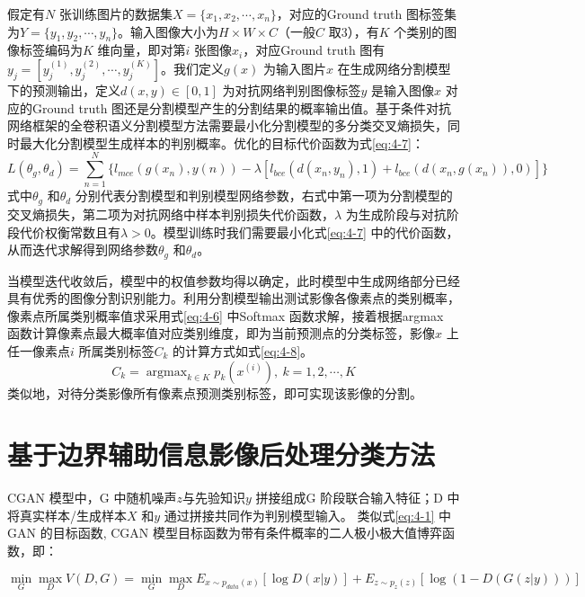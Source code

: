 假定有$N$ 张训练图片的数据集$X = \{x_1,x_2,\cdots, x_n \}$，对应的Ground truth 图标签集为$Y = \{y_1,y_2,\cdots, y_n \}$。输入图像大小为$H\times W\times C$（一般$C$ 取$3$），有$K$ 个类别的图像标签编码为$K$  维向量，即对第$i$ 张图像$x_i$，对应Ground truth 图有$y_j = [y_j^{(1)},y_j^{(2)}, \cdots, y_j^{(K)}]$。我们定义$g(x)$ 为输入图片$x$ 在生成网络分割模型下的预测输出，定义$d(x,y)\in [0,1]$ 为对抗网络判别图像标签$y$ 是输入图像$x$ 对应的Ground truth 图还是分割模型产生的分割结果的概率输出值。基于条件对抗网络框架的全卷积语义分割模型方法需要最小化分割模型的多分类交叉熵损失，同时最大化分割模型生成样本的判别概率。优化的目标代价函数为式\ref{eq:4-7}：
\begin{equation}
  \label{eq:4-7}
  L(\theta_g,\theta_d) = \sum_{n=1}^N \lbrace l_{mce} (g(x_n),y(n)) - \lambda [l_{bce} (d(x_n,y_n),1) + l_{bce}(d(x_n,g(x_n)),0)] \rbrace
\end{equation}
式中$\theta_g$ 和$\theta_d$ 分别代表分割模型和判别模型网络参数，右式中第一项为分割模型的交叉熵损失，第二项为对抗网络中样本判别损失代价函数，$\lambda$ 为生成阶段与对抗阶段代价权衡常数且有$\lambda > 0$。模型训练时我们需要最小化式\ref{eq:4-7} 中的代价函数，从而迭代求解得到网络参数$\theta_g$ 和$\theta_d$。

当模型迭代收敛后，模型中的权值参数均得以确定，此时模型中生成网络部分已经具有优秀的图像分割识别能力。利用分割模型输出测试影像各像素点的类别概率，像素点所属类别概率值求采用式\ref{eq:4-6} 中Softmax 函数求解，接着根据argmax 函数计算像素点最大概率值对应类别维度，即为当前预测点的分类标签，影像$x$ 上任一像素点$i$ 所属类别标签$C_k$ 的计算方式如式\ref{eq:4-8}。
\begin{equation}
  \label{eq:4-8}
  C_k = \mathop{\arg\max}_{k \in K} p_k(x^{(i)}), \ k=1,2,\cdots,K
\end{equation}
类似地，对待分类影像所有像素点预测类别标签，即可实现该影像的分割。


\section{基于边界辅助信息影像后处理分类方法}
\label{sec::chap04-4}
CGAN 模型中，G 中随机噪声$z$与先验知识$y$ 拼接组成G 阶段联合输入特征；D 中将真实样本/生成样本$X$ 和$y$ 通过拼接共同作为判别模型输入。 类似式\ref{eq:4-1} 中GAN 的目标函数, CGAN 模型目标函数为带有条件概率的二人极小极大值博弈函数，即：

\begin{equation}
  \label{eq:4-3}
  \mathop{\min}_{G} \mathop{\max}_{D} V(D,G) = \mathop{\min}_{G} \mathop{\max}_{D} E_{x \sim p_{data}(x)} [\log D(x|y)] + E_{z \sim p_{z}(z)}[ \log (1-D(G(z|y)))]
\end{equation}

